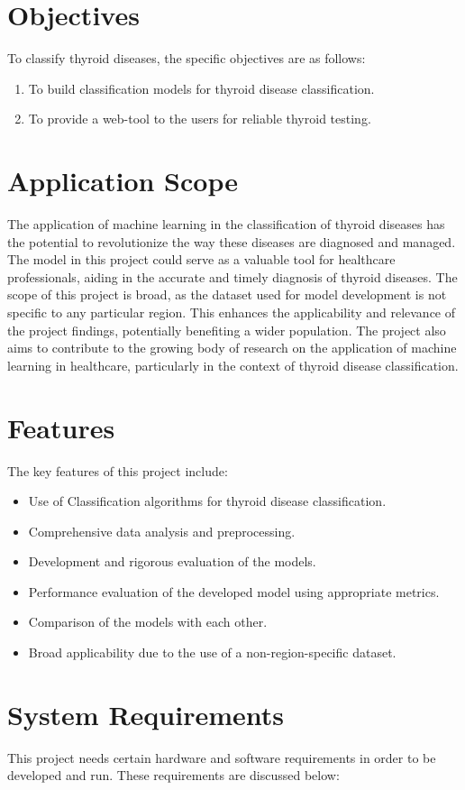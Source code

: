 \section{Objectives}
To classify thyroid diseases, the specific objectives are as follows:
\begin{enumerate}[label=\roman*]
    \item To build classification models for thyroid disease classification.
    \item To provide a web-tool to the users for reliable thyroid testing.
\end{enumerate}

\section{Application Scope}
The application of machine learning in the classification of thyroid diseases has the potential to revolutionize the way these diseases are diagnosed and managed. The model in this project could serve as a valuable tool for healthcare professionals, aiding in the accurate and timely diagnosis of thyroid diseases. The scope of this project is broad, as the dataset used for model development is not specific to any particular region. This enhances the applicability and relevance of the project findings, potentially benefiting a wider population. The project also aims to contribute to the growing body of research on the application of machine learning in healthcare, particularly in the context of thyroid disease classification.
\section{Features}
The key features of this project include:
\begin{itemize}
\item Use of Classification algorithms for thyroid disease classification.
\item Comprehensive data analysis and preprocessing.
\item Development and rigorous evaluation of the models.
\item Performance evaluation of the developed model using appropriate metrics.
\item Comparison of the models with each other.
\item Broad applicability due to the use of a non-region-specific dataset.
\end{itemize}
\section{System Requirements}
This project needs certain hardware and software requirements in order to be developed and run. These requirements are discussed below:
